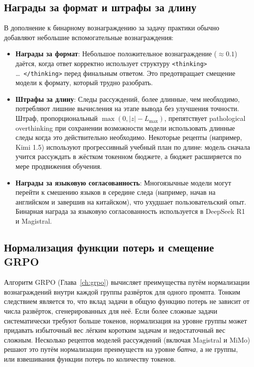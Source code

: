 \subsection{Награды за формат и штрафы за длину}
\label{subsec:format-rewards}

В дополнение к бинарному вознаграждению за задачу практики обычно добавляют
небольшие вспомогательные вознаграждения:

\begin{itemize}[leftmargin=*]
\item \textbf{Награды за формат}: Небольшое положительное вознаграждение ($\approx 0.1$)
  даётся, когда ответ корректно использует структуру \texttt{<thinking>}
  \ldots\ \texttt{</thinking>} перед финальным ответом. Это предотвращает
  смещение модели к формату, который трудно разобрать.

\item \textbf{Штрафы за длину}: Следы рассуждений, более длинные, чем
  необходимо, потребляют лишние вычисления на этапе вывода без улучшения точности.
  Штраф, пропорциональный $\max(0, |z| - L_{\max})$, препятствует
  pathological overthinking при сохранении
  возможности модели использовать длинные следы когда это действительно необходимо. Некоторые
  рецепты (например, Kimi 1.5) используют прогрессивный учебный план по длине:
  модель сначала учится рассуждать в жёстком токенном бюджете, а
  бюджет расширяется по мере продвижения обучения.

\item \textbf{Награды за языковую согласованность}: Многоязычные модели могут
  перейти к смешению языков в середине следа (например, начав на английском
  и завершив на китайском), что ухудшает пользовательский опыт. Бинарная
  награда за языковую согласованность используется в DeepSeek R1 и Magistral.
\end{itemize}

\subsection{Нормализация функции потерь и смещение GRPO}
\label{subsec:loss-norm}

Алгоритм GRPO (Глава~\ref{ch:grpo}) вычисляет преимущества путём
нормализации вознаграждений внутри каждой группы развёрток для одного
промпта. Тонким следствием является то, что вклад задачи в
общую функцию потерь не зависит от числа развёрток, сгенерированных
для неё. Если более сложные задачи систематически требуют больше токенов,
нормализация на уровне группы может придавать избыточный вес лёгким коротким задачам
и недостаточный вес сложным. Несколько рецептов моделей
рассуждений (включая Magistral и MiMo) решают это путём нормализации преимуществ
на уровне \emph{батча}, а не группы, или взвешивания функции потерь
по количеству токенов.

